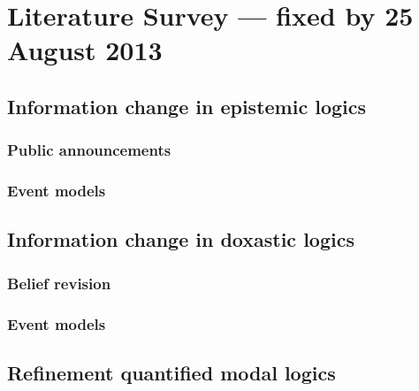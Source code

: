 \section{Literature Survey --- fixed by 25 August 2013}

\subsection{Information change in epistemic logics}
\subsubsection{Public announcements}
\subsubsection{Event models}

\subsection{Information change in doxastic logics}
\subsubsection{Belief revision}
\subsubsection{Event models}

\subsection{Refinement quantified modal logics}
